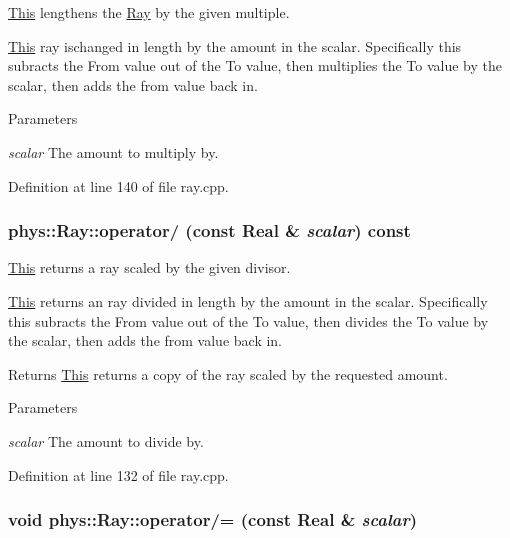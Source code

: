 \hyperlink{structThis}{This} lengthens the \hyperlink{classphys_1_1Ray}{Ray} by the given multiple. 

\hyperlink{structThis}{This} ray ischanged in length by the amount in the scalar. Specifically this subracts the From value out of the To value, then multiplies the To value by the scalar, then adds the from value back in. 
\begin{DoxyParams}{Parameters}
\item[{\em scalar}]The amount to multiply by. \end{DoxyParams}


Definition at line 140 of file ray.cpp.

\hypertarget{classphys_1_1Ray_a126f8e4db94cccb5c0040db29c771a47}{
\subsubsection[{operator/}]{ phys::Ray::operator/ (const {\bf Real} \& {\em scalar}) const}}
\label{df/d57/classphys_1_1Ray_a126f8e4db94cccb5c0040db29c771a47}


\hyperlink{structThis}{This} returns a ray scaled by the given divisor. 

\hyperlink{structThis}{This} returns an ray divided in length by the amount in the scalar. Specifically this subracts the From value out of the To value, then divides the To value by the scalar, then adds the from value back in. \begin{DoxyReturn}{Returns}
\hyperlink{structThis}{This} returns a copy of the ray scaled by the requested amount. 
\end{DoxyReturn}

\begin{DoxyParams}{Parameters}
\item[{\em scalar}]The amount to divide by. \end{DoxyParams}


Definition at line 132 of file ray.cpp.

\hypertarget{classphys_1_1Ray_a11f681152a5a39c36f2b398d44657ecd}{
\subsubsection[{operator/=}]{\setlength{\rightskip}{0pt plus 5cm}void phys::Ray::operator/= (const {\bf Real} \& {\em scalar})}}
\label{df/d57/classphys_1_1Ray_a11f681152a5a39c36f2b398d44657ecd}


